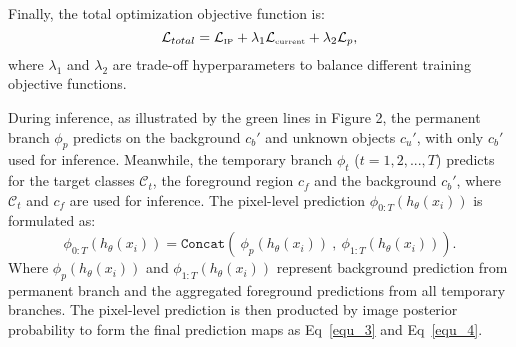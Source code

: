 

\vspace{-10pt}
Finally, the total optimization objective function is:
\begin{equation}
    \mathcal{L}_{total}=\mathcal{L}_{\text{\tiny IP}}+\lambda_{1}\mathcal{L}_{\text{\tiny current}}+\lambda_{2}\mathcal{L}_{p},
\end{equation}
where \(\lambda_1\) and \(\lambda_2\) are trade-off hyperparameters to balance different training objective functions.

During inference, as illustrated by the green lines in Figure 2, the permanent branch $\phi_p$ predicts on the background $c_b'$ and unknown objects $c_u'$, with only $c_b'$ used for inference. Meanwhile, the temporary branch $\phi_t$ ($t=1,2,...,T$) predicts for the target classes $\mathcal{C}_t$, the foreground region \( c_f \) and the background $c_b'$, where $\mathcal{C}_t$ and \( c_f \) are used for inference. The pixel-level prediction $\phi_{0:T}(h_\theta(x_i))$ is formulated as:
\begin{equation}
\phi_{0:T}(h_{\theta}(x_i)) = \texttt{Concat}( ~\phi_{p}(h_\theta(x_i))~,~\phi_{1:T}(h_\theta(x_i))).
\end{equation} 
Where $\phi_{p}(h_\theta(x_i))$ and $\phi_{1:T}(h_\theta(x_i))$ represent background prediction from permanent branch and the aggregated foreground predictions from all temporary branches. The pixel-level prediction is then producted by image posterior probability to form the final prediction maps as Eq~\ref{equ_3} and Eq~\ref{equ_4}.


